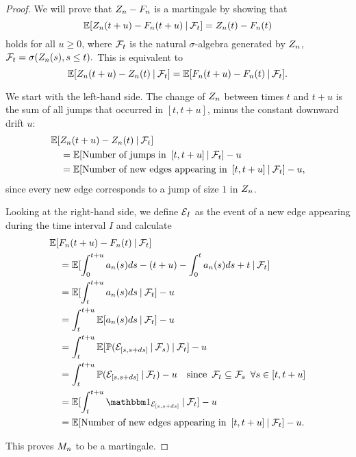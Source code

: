 \begin{proof} \label{P: decomp Zn}
	We will prove that $Z_n - F_n$ is a martingale by showing that
	\begin{equation} \label{E: Mn martingale}
	\mathbb{E}[ Z_n(t+u) - F_n(t+u) \: | \: \mathcal{F}_{t} ] = Z_n(t) - F_n(t)
	\end{equation}
	holds for all $u \geq 0$, where $\mathcal{F}_{t}$ is the natural $\sigma$-algebra generated by $Z_n$, 
	$\mathcal{F}_{t} = \sigma(Z_n(s), s \leq t).$
	This is equivalent to 
	\begin{equation}
	\mathbb{E}[Z_n(t+u) - Z_n(t) \: | \: \mathcal{F}_{t}] = \mathbb{E}[F_n(t+u) - F_n(t) \: | \: \mathcal{F}_{t}].
	\end{equation}
	
	We start with the left-hand side. 
	The change of $Z_n$ between times $t$ and $t+u$ is the sum of all jumps that occurred in $[t, t+u]$,
	minus the constant downward drift $u$:
	\begin{align*}
	&\mathbb{E}[Z_n(t+u) - Z_n(t) \: | \: \mathcal{F}_{t}] \\
	&\quad= \mathbb{E}[\text{Number of jumps in} \enspace [t, t+u] \: | \: \mathcal{F}_{t}] - u \\
	&\quad= \mathbb{E}[\text{Number of new edges appearing in} \enspace [t, t+u] \: | \: \mathcal{F}_{t}] - u,
	\end{align*}
	since every new edge corresponds to a jump of size $1$ in $Z_n$.
	
	Looking at the right-hand side, we define $\mathcal{E}_{I}$\label{I: Event} as the event of a new edge appearing during the time interval $I$ and calculate
	\begin{align*}
	&\Exp{\An(t+u) - \An(t) \cond \F{t}} \\
	&\quad= \Exp{ \int_{0}^{t+u} a_n(s)ds - (t+u) - \int_{0}^{t} a_n(s)ds + t \cond \F{t} } \\
	&\quad= \Exp{ \int_{t}^{t+u} a_n(s)ds \cond \F{t} } - u \\
	&\quad= \int_{t}^{t+u} \Exp{a_n(s)ds \cond \F{t}} - u \\
	&\quad= \int_{t}^{t+u} \Exp{ \Prob(\NewEdge{\sds} \cond \F{s}) \cond \F{t} } - u\\
	&\quad= \int_{t}^{t+u} \Prob( \NewEdge{\sds} \cond \F{t} ) - u
	\quad \text{since} \enspace \F{t} \subseteq \F{s} \enspace \forall s \in [t,t+u] \\
	&\quad= \Exp{ \int_{t}^{t+u}  \Ind{\NewEdge{\sds}} \cond \F{t}} -u \\
	&\quad= \Exp{\text{Number of new edges appearing in} \enspace [t, t+u] \cond \F{t}} - u.
	\end{align*}
	
	
	This proves $M_n$ to be a martingale. 	
\end{proof}

